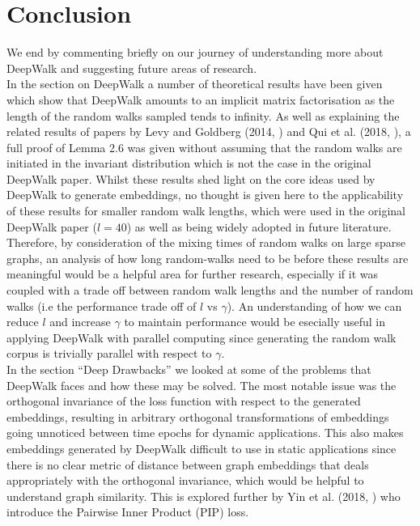 \documentclass[a4paper]{article}
\begin{document}
\section{Conclusion}
We end by commenting briefly on our journey of understanding more about DeepWalk and suggesting future areas of research.\\
In the section on DeepWalk a number of theoretical results have been given which show that DeepWalk amounts to an implicit matrix factorisation as the length of the random walks sampled tends to infinity.
As well as explaining the related results of papers by Levy and Goldberg (2014, \cite{levy&goldberg}) and  Qui et al. (2018, \cite{qiu2018}), a full proof of Lemma 2.6 was given without assuming that the random walks are initiated in the invariant distribution which is not the case in the original DeepWalk paper.
Whilst these results shed light on the core ideas used by DeepWalk to generate embeddings, no thought is given here to the applicability of these results for smaller random walk lengths, which were used in the original DeepWalk paper ($l = 40$) as well as being widely adopted in future literature. Therefore, by consideration of the mixing times of random walks on large sparse graphs, an analysis of how long random-walks need to be before these
results are meaningful would be a helpful area for further research, especially if it was coupled with a trade off between random walk lengths and the number of random walks (i.e the performance trade off of $l$ vs $\gamma$). An understanding of how we can reduce $l$ and increase $\gamma$ to maintain performance would be esecially useful in applying DeepWalk with parallel computing since generating the random walk corpus is trivially parallel with respect to $\gamma$.\\
In the section ``Deep Drawbacks'' we looked at some of the problems that DeepWalk faces and how these may be solved. The most notable issue was the orthogonal invariance of the loss function with respect to the generated embeddings, resulting in arbitrary orthogonal transformations of embeddings going unnoticed
between time epochs for dynamic applications. This also makes embeddings generated by DeepWalk difficult to use in static applications since there is no clear metric of distance between graph embeddings that deals appropriately with the orthogonal invariance, which would be helpful to understand graph similarity. This is explored further by Yin et al. (2018, \cite{yin2018}) who introduce the Pairwise Inner Product (PIP) loss.\\
\end{document}
